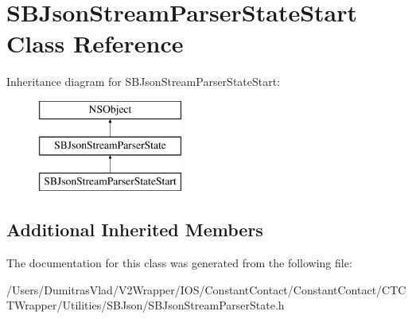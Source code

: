 \hypertarget{interface_s_b_json_stream_parser_state_start}{\section{S\-B\-Json\-Stream\-Parser\-State\-Start Class Reference}
\label{interface_s_b_json_stream_parser_state_start}
}
Inheritance diagram for S\-B\-Json\-Stream\-Parser\-State\-Start\-:\begin{figure}[H]
\begin{center}
\leavevmode
\includegraphics[height=3.000000cm]{interface_s_b_json_stream_parser_state_start}
\end{center}
\end{figure}
\subsection*{Additional Inherited Members}


The documentation for this class was generated from the following file\-:\begin{DoxyCompactItemize}
\item 
/\-Users/\-Dumitras\-Vlad/\-V2\-Wrapper/\-I\-O\-S/\-Constant\-Contact/\-Constant\-Contact/\-C\-T\-C\-T\-Wrapper/\-Utilities/\-S\-B\-Json/S\-B\-Json\-Stream\-Parser\-State.\-h\end{DoxyCompactItemize}
